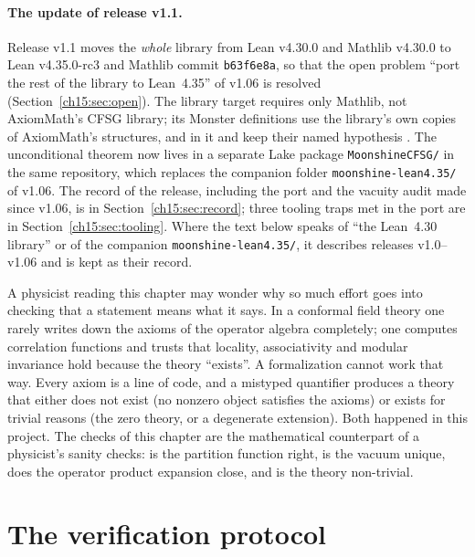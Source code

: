 \paragraph{The update of release v1.1.} Release v1.1 moves the \emph{whole} library from Lean v4.30.0 and Mathlib
v4.30.0 to Lean v4.35.0-rc3 and Mathlib commit \texttt{b63f6e8a}, so that the open problem ``port the rest of the
library to Lean~4.35'' of v1.06 is resolved (Section~\ref{ch15:sec:open}). The library target  requires only
Mathlib, not AxiomMath's CFSG library; its Monster definitions use the library's own copies of AxiomMath's structures,
and in it  and  keep their named hypothesis . The
unconditional theorem  now lives in a separate Lake package
\texttt{MoonshineCFSG/} in the same repository, which replaces the companion folder \texttt{moonshine-lean4.35/} of
v1.06. The record of the release, including the port and the vacuity audit made since v1.06, is in
Section~\ref{ch15:sec:record}; three tooling traps met in the port are in Section~\ref{ch15:sec:tooling}. Where the
text below speaks of ``the Lean~4.30 library'' or of the companion \texttt{moonshine-lean4.35/}, it describes releases
v1.0--v1.06 and is kept as their record.

\begin{remark}\label{ch15:rem:physics}
A physicist reading this chapter may wonder why so much effort goes into checking that a
statement means what it says. In a conformal field theory one rarely writes down the axioms of
the operator algebra completely; one computes correlation functions and trusts that locality,
associativity and modular invariance hold because the theory ``exists''. A formalization cannot
work that way. Every axiom is a line of code, and a mistyped quantifier produces a theory that
either does not exist (no nonzero object satisfies the axioms) or exists for trivial reasons (the
zero theory, or a degenerate extension). Both happened in this project. The checks of this chapter
are the mathematical counterpart of a physicist's sanity checks: is the partition function right,
is the vacuum unique, does the operator product expansion close, and is the theory non-trivial.
\end{remark}

\section{The verification protocol}\label{ch15:sec:protocol}

